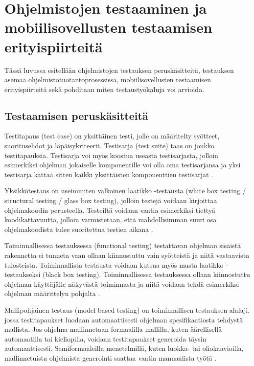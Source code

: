 \section{Ohjelmistojen testaaminen ja mobiilisovellusten testaamisen erityispiirteitä}

Tässä luvussa esitellään ohjelmistojen testauksen peruskäsitteitä, testauksen asemaa ohjelmistotuotantoprosessissa, mobiilisovellusten testaamisen erityispiirteitä sekä pohditaan miten testaustyökaluja voi arvioida.

\subsection{Testaamisen peruskäsitteitä}

Testitapaus (test case) on yksittäinen testi, jolle on määritelty syötteet, suoritusehdot ja läpäisykriteerit. Testisarja (test suite) taas on joukko testitapauksia. Testisarja voi myös koostua useasta testisarjasta, jolloin esimerkiksi ohjelman jokaiselle komponentille voi olla oma testisarjansa ja yksi testisarja kattaa sitten kaikki yksittäisten komponenttien testisarjat \cite[153]{testing}.

Yksikkötestaus on useimmiten valkoinen laatikko -testausta (white box testing / structural testing / glass box testing), jolloin testejä voidaan kirjoittaa ohjelmakoodin perusteella. Testeiltä voidaan vaatia esimerkiksi tiettyä koodikattavuutta, jolloin varmistetaan, että mahdollisimman suuri osa ohjelmakoodista tulee suoritettua testien aikana \cite[154]{testing}.

Toiminnallisessa testauksessa (functional testing) testattavan ohjelman sisäistä rakennetta ei tunneta vaan ollaan kiinnostuttu vain syötteistä ja niitä vastaavista tulosteista. Toiminnallista testausta voidaan kutsua myös musta laatikko -testaukseksi (black box testing). Toiminnallisessa testauksessa ollaan kiinnostuttu ohjelman käyttäjälle näkyvästä toiminnasta ja niitä voidaan tehdä esimerkiksi ohjelman määrittelyn pohjalta \cite[161-162]{testing}.

Mallipohjainen testaus (model based testing) on toiminnallisen testauksen alalaji, jossa testitapaukset luodaan automaattisesti ohjelman spesifikaatiosta tehdystä mallista. Jos ohjelma mallinnetaan formaalilla mallilla, kuten äärellisellä automaatilla tai kieliopilla, voidaan testitapaukset generoida täysin automaattisesti. Semiformaaleilla menetelmillä, kuten luokka- tai oliokaavioilla, mallinnetuista ohjelmista generointi saattaa vaatia manuaalista työtä \cite[245-250]{testing}.

